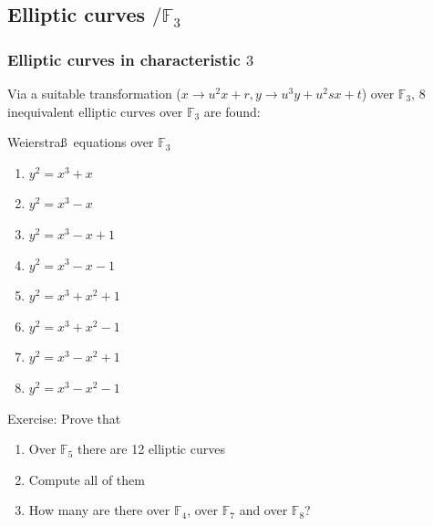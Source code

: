 \documentclass[10pt,handout]{beamer} %
\newcommand{\F}{\mathbb F}
\theoremstyle{definition}
\begin{document}
\subsection{Elliptic curves \texorpdfstring{$/\F_3$}{F3}}
\begin{frame}
\frametitle{Elliptic curves in characteristic $3$}

Via a suitable transformation ($x\rightarrow u^2x+r, y\rightarrow u^3y+u^2sx+t$) over $\F_3$,  $8$ inequivalent
elliptic curves over $\F_3$ are found:\pause

\begin{beamerboxesrounded}[upper=block title example,lower=block body alerted,shadow=true]{Weierstra\ss\ equations over $\F_3$}
\begin{enumerate}
 \item $y^2=x^3+x$
 \item$y^2=x^3 - x$
 \item$y^2=x^3 - x +1$
 \item$y^2=x^3 - x -1$
 \item$y^2=x^3 + x^2 + 1$
 \item$y^2=x^3 + x^2 - 1$
 \item$y^2=x^3 - x^2 + 1$
 \item$y^2=x^3 - x^2 - 1$
 \end{enumerate}
\end{beamerboxesrounded}\pause

\begin{block}{Exercise: Prove that}
\begin{enumerate}[<+-| alert@+>]
\item Over  $\F_5$ there are 12 elliptic curves
          \item Compute all of them
           \item How many are there over $\F_4$, over $\F_7$ and over $\F_8$?
         \end{enumerate}
\end{block}



\end{frame}
\end{document}
